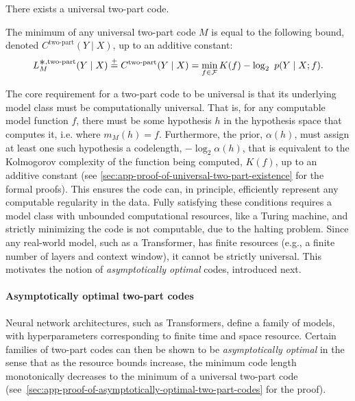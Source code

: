 \begin{prop}
There exists a universal two-part code.
\label{thm:universal-two-part-existence}
\end{prop}

\begin{cor}\label{thm:universal-two-part-min} The minimum of any universal two-part code $M$ is equal to the following bound, denoted $C^{\text{two-part}}(Y \mid X)$, up to an additive constant:
\begin{equation}
L_M^{\bigast,\text{two-part}}(Y \mid X) \eqc C^{\text{two-part}}(Y \mid X) = \min_{f \in \gF} K(f) - \log_2~p(Y \mid X;f).
\end{equation}
\end{cor}
The core requirement for a two-part code to be universal is that its underlying model class must be computationally universal. That is, for any computable model function $f$, there must be some hypothesis $h$ in the hypothesis space that computes it, i.e. where $m_M(h) = f$. Furthermore, the prior, $\alpha(h)$, must assign at least one such hypothesis a codelength, $-\log_2 \alpha(h)$, that is equivalent to the Kolmogorov complexity of the function being computed, $K(f)$, up to an additive constant (see \ref{sec:app-proof-of-universal-two-part-existence} for the formal proofs). This ensures the code can, in principle, efficiently represent any computable regularity in the data. 
Fully satisfying these conditions requires a model class with unbounded computational resources, like a Turing machine, and strictly minimizing the code is not computable, due to the halting problem. Since any real-world model, such as a Transformer, has finite resources (e.g., a finite number of layers and context window), it cannot be strictly universal. This motivates the notion of \emph{asymptotically optimal} codes, introduced next. %


\paragraph{Asymptotically optimal two-part codes} 
Neural network architectures, such as Transformers, define a family of models, with hyperparameters corresponding to finite time and space resource. 
Certain families of two-part codes can then be shown to be \emph{asymptotically optimal} in the sense that as the resource bounds increase, the minimum code length monotonically decreases to the minimum of a universal two-part code (see~\ref{sec:app-proof-of-asymptotically-optimal-two-part-codes} for the proof).

